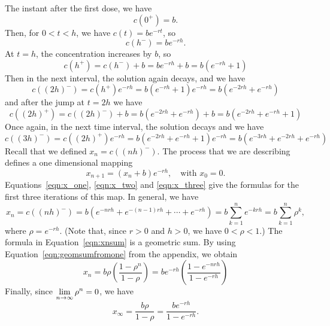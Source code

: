 The instant after the first dose, we have
\begin{equation}
  c(0^{+}) = b.
\end{equation}
Then, for $0 < t < h$, we have $c(t) = be^{-rt}$, so
\begin{equation}
  c(h^{-}) = be^{-rh}.
\label{eqn:x_one}
\end{equation}
At $t=h$, the concentration increases by $b$, so
\begin{equation}
  c(h^{+}) = c(h^{-})+b = be^{-rh} + b = b\left(e^{-rh}+1\right)
\end{equation}
Then in the next interval, the solution again decays, and we have
\begin{equation}
  c((2h)^{-}) = c(h^{+})e^{-rh} = b\left(e^{-rh}+1\right) e^{-rh}
     = b\left(e^{-2rh} + e^{-rh}\right)
\label{eqn:x_two}
\end{equation}
and after the jump at $t=2h$ we have
\begin{equation}
  c((2h)^{+}) = c((2h)^{-})+b = b\left(e^{-2rh}+e^{-rh}\right) + b
     = b\left( e^{-2rh} + e^{-rh}+1\right)
\end{equation}
Once again, in the next time interval, the solution decays and we have
\begin{equation}
  c((3h)^{-}) = c((2h)^{+})e^{-rh} = b\left( e^{-2rh} + e^{-rh}+1\right)e^{-rh}
    = b\left( e^{-3rh} + e^{-2rh}+e^{-rh}\right)
\label{eqn:x_three}
\end{equation}
Recall that we defined $x_n = c((nh)^{-})$.
The process that we are describing defines a one dimensional mapping
\begin{equation}
   x_{n+1} = (x_n+b)e^{-rh}, \quad \textrm{with $x_0=0$.}
\end{equation}
Equations~\eqref{eqn:x_one}, \eqref{eqn:x_two} and
\eqref{eqn:x_three} give the formulas for the first three
iterations of this map.
In general, we have
\begin{equation}
  x_n = c((nh)^{-}) = b\left( e^{-nrh} + e^{-(n-1)rh} + \cdots + e^{-rh}\right)
        = b \sum_{k=1}^{n} e^{-krh}
	= b \sum_{k=1}^{n} \rho^k,
\label{eqn:xnsum}
\end{equation}
where $\rho = e^{-rh}$.
(Note that, since $r>0$ and $h>0$, we have $0 < \rho < 1$.)
The formula in Equation~\eqref{eqn:xnsum} is a geometric sum.
By using Equation~\eqref{eqn:geomsumfromone} from the
appendix, we obtain
\begin{equation}
  x_n = b \rho\left(\frac{1-\rho^n}{1-\rho}\right)
      = be^{-rh}\left(\frac{1-e^{-nrh}}{1-e^{-rh}}\right)
\end{equation}
Finally, since $\displaystyle \lim_{n\rightarrow\infty} \rho^n = 0$, we have
\begin{equation}
  x_{\infty} = \frac{b\rho}{1-\rho}
     = \frac{be^{-rh}}{1-e^{-rh}}. 
\end{equation}

